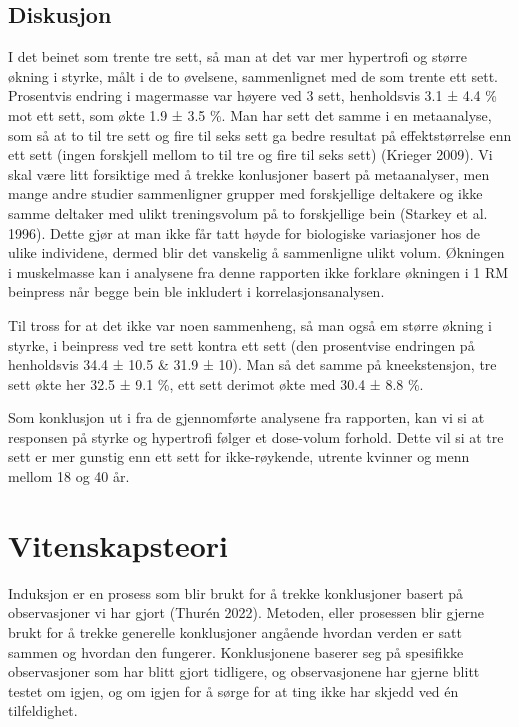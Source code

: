 \documentclass[
  letterpaper,
  DIV=11,
  numbers=noendperiod]{scrreprt}
\begin{document}
\section{Diskusjon}\label{diskusjon-5}

I det beinet som trente tre sett, så man at det var mer hypertrofi og
større økning i styrke, målt i de to øvelsene, sammenlignet med de som
trente ett sett. Prosentvis endring i magermasse var høyere ved 3 sett,
henholdsvis 3.1 ± 4.4 \% mot ett sett, som økte 1.9 ± 3.5 \%. Man har
sett det samme i en metaanalyse, som så at to til tre sett og fire til
seks sett ga bedre resultat på effektstørrelse enn ett sett (ingen
forskjell mellom to til tre og fire til seks sett) (Krieger 2009). Vi
skal være litt forsiktige med å trekke konlusjoner basert på
metaanalyser, men mange andre studier sammenligner grupper med
forskjellige deltakere og ikke samme deltaker med ulikt treningsvolum på
to forskjellige bein (Starkey et al. 1996). Dette gjør at man ikke får
tatt høyde for biologiske variasjoner hos de ulike individene, dermed
blir det vanskelig å sammenligne ulikt volum. Økningen i muskelmasse kan
i analysene fra denne rapporten ikke forklare økningen i 1 RM beinpress
når begge bein ble inkludert i korrelasjonsanalysen.

Til tross for at det ikke var noen sammenheng, så man også em større
økning i styrke, i beinpress ved tre sett kontra ett sett (den
prosentvise endringen på henholdsvis 34.4 ± 10.5 \& 31.9 ± 10). Man så
det samme på kneekstensjon, tre sett økte her 32.5 ± 9.1 \%, ett sett
derimot økte med 30.4 ± 8.8 \%.

Som konklusjon ut i fra de gjennomførte analysene fra rapporten, kan vi
si at responsen på styrke og hypertrofi følger et dose-volum forhold.
Dette vil si at tre sett er mer gunstig enn ett sett for ikke-røykende,
utrente kvinner og menn mellom 18 og 40 år.


\chapter{Vitenskapsteori}\label{vitenskapsteori}

Induksjon er en prosess som blir brukt for å trekke konklusjoner basert
på observasjoner vi har gjort (Thurén 2022). Metoden, eller prosessen
blir gjerne brukt for å trekke generelle konklusjoner angående hvordan
verden er satt sammen og hvordan den fungerer. Konklusjonene baserer seg
på spesifikke observasjoner som har blitt gjort tidligere, og
observasjonene har gjerne blitt testet om igjen, og om igjen for å sørge
for at ting ikke har skjedd ved én tilfeldighet.
\end{document}
